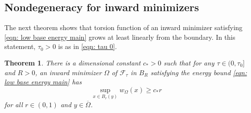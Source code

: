 \documentclass[10pt, reqno]{amsart}
\numberwithin{equation}{section}
\newtheorem{theorem}{Theorem}[section]
\def\W{\Omega}
\def\err{\tau}
\def\Ep{\mathcal{F}_{\err}}
\begin{document}
%

\subsection{Nondegeneracy for inward minimizers}
The next theorem shows that torsion function of an inward minimizer satisfying \eqref{eqn: low base energy main} grows at least linearly from the boundary. In this statement, $\tau_0>0$ is as in  \eqref{eqn: tau 0}.
%
%
%
%


\begin{theorem} \label{t:lb}  
There is a dimensional constant $c_* >0$ such that for any 
$\err\in ( 0,\err_0]$ and $R>0$, an inward minimizer $\W$ of $\Ep$ in $B_R$ satisfying the energy bound \eqref{eqn: low base energy main} has
\begin{equation}\label{def: DO}
	  \sup_{x \in B_r(y)}  w_\W(x)  \geq c_* r
\end{equation}
for all $r \in(0,1)$ and $y \in \overline{\Omega}$.
\end{theorem}
%
%
%
%
%
\end{document}

